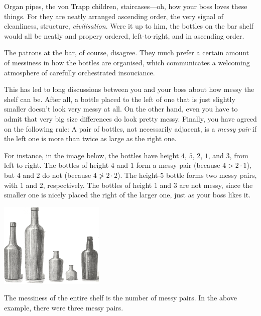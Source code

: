 

Organ pipes, the von Trapp children, staircases---oh, how your boss loves these things.
For they are neatly arranged ascending order, the very signal of cleanliness, structure, \emph{civilisation}.
Were it up to him, the bottles on the bar shelf would all be neatly and propery ordered, left-to-right, and in ascending order.

The patrons at the bar, of course, disagree.
They much prefer a certain amount of messiness in how the bottles are organised, which communicates a welcoming atmosphere of carefully orchestrated insouciance. 

This has led to long discussions between you and your boss about how messy the shelf can be.
After all, a bottle placed to the left of one that is just slightly smaller doesn't look very messy at all.
On the other hand, even you have to admit that very big size differences do look pretty messy.
Finally, you have agreed on the following rule:
A pair of bottles, not necessarily adjacent, is a \emph{messy pair} if the left one is more than twice as large as the right one.

\medskip
For instance, in the image below, the bottles have height $4$, $5$, $2$, $1$, and $3$, from left to right.
The bottles of height $4$ and $1$ form a messy pair (because $4 > 2\cdot 1$), but $4$ and $2$ do not (because $4\not> 2\cdot 2$).
The height-$5$ bottle forms two messy pairs, with $1$ and $2$, respectively.
The bottles of height $1$ and $3$ are not messy, since the smaller one is nicely placed the right of the larger one, just as your boss likes it.

\medskip
\includegraphics[width = 5cm]{img/messy_bottles.png}

The messiness of the entire shelf is the number of messy pairs.
In the above example, there were three messy pairs.



